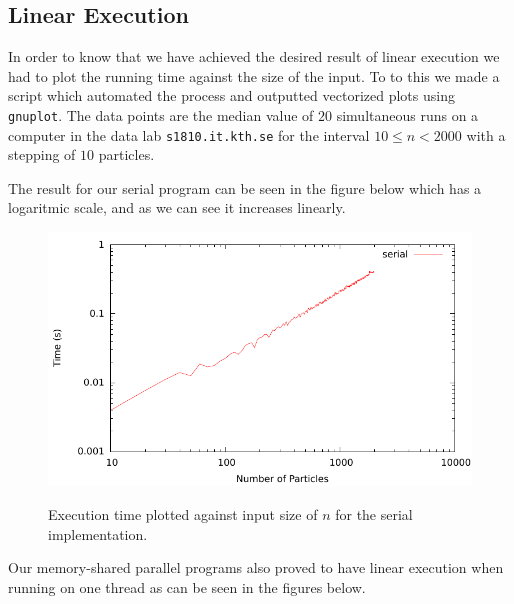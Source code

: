
\subsection{Linear Execution}

In order to know that we have achieved the desired result of linear execution we
had to plot the running time against the size of the input. To to this we made a
script which automated the process and outputted vectorized plots using
\texttt{gnuplot}. The data points are the median value of $20$ simultaneous runs
on a computer in the data lab \texttt{s1810.it.kth.se} for the interval $10 \leq
n < 2000$ with a stepping of $10$ particles.

The result for our serial program can be seen in the figure below which has a
logaritmic scale, and as we can see it increases linearly.

\begin{figure}[H]
	\includegraphics{plots/serial.pdf}
	\label{serial_linear}
	\caption{Execution time plotted against input size of $n$ for the serial implementation.}
\end{figure}

Our memory-shared parallel programs also proved to have linear execution when running on one thread as can be seen in the figures below.

